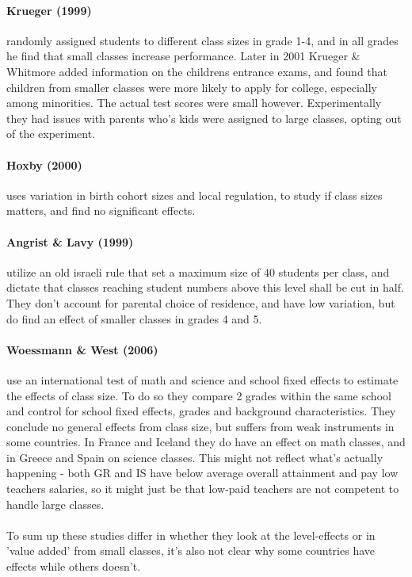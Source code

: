 \documentclass[12pt, a4paper]{article}
\begin{document}
\begin{multicols}{2}
\paragraph{Krueger (1999)} randomly assigned students to different class sizes in grade 1-4, and in all grades he find that small classes increase performance. Later in 2001 Krueger \& Whitmore added information on the childrens entrance exams, and found that children from smaller classes were more likely to apply for college, especially among minorities. The actual test scores were small however. Experimentally they had issues with parents who's kids were assigned to large classes, opting out of the experiment. 

\paragraph{Hoxby (2000)} uses variation in birth cohort sizes and local regulation, to study if class sizes matters, and find no significant effects. 

\paragraph{Angrist \& Lavy (1999)} utilize an old israeli rule that set a maximum size of 40 students per class, and dictate that classes reaching student numbers above this level shall be cut in half. They don't account for parental choice of residence, and have low variation, but do find an effect of smaller classes in grades 4 and 5.

\paragraph{Woessmann \& West (2006)} use an international test of math and science and school fixed effects to estimate the effects of class size. To do so they compare 2 grades within the same school and control for school fixed effects, grades and background characteristics. They conclude no general effects from class size, but suffers from weak instruments in some countries. In France and Iceland they do have an effect on math classes, and in Greece and Spain on science classes. This might not reflect what's actually happening - both GR and IS have below average overall attainment and pay low teachers salaries, so it might just be that low-paid teachers are not competent to handle large classes. 
\\ \\
To sum up these studies differ in whether they look at the level-effects or in 'value added' from small classes, it's also not clear why some countries have effects while others doesn't. 


\end{multicols}
\end{document}
